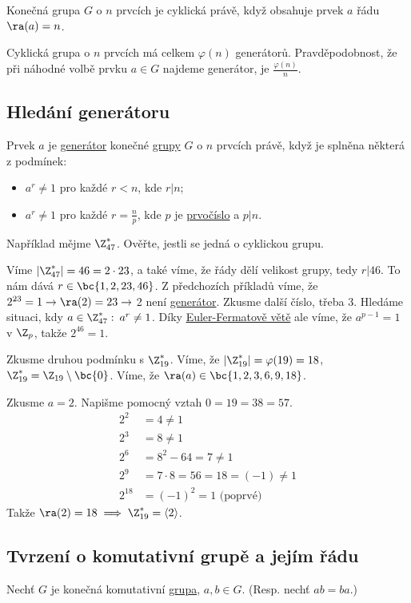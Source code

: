 Konečná grupa $G$ o $n$ prvcích je cyklická právě, když obsahuje prvek $a$ řádu $\ra(a) = n$.

Cyklická grupa o $n$ prvcích má celkem $\varphi(n)$ generátorů. Pravděpodobnost, že při náhodné volbě prvku $a \in G$ najdeme generátor, je $\frac{\varphi(n)}{n}$.

\subsection{Hledání generátoru}
Prvek $a$ je \hyperref[generator]{generátor} konečné \hyperref[grupa]{grupy} $G$ o $n$ prvcích právě, když je splněna některá z podmínek:
\vspace{-1em}
\begin{itemize}
	\item $a^r \not=1$ pro každé $r < n$, kde $r | n$;
	\item $a^r \not=1$ pro každé $r = \frac{n}{p}$, kde $p$ je \hyperref[prvocisla]{prvočíslo} a $p | n$.
\end{itemize}
Například mějme $\Z_{47}^*$. Ověřte, jestli se jedná o cyklickou grupu.

Víme $|\Z_{47}^*| = 46 = 2 \cdot 23$, a také víme, že řády dělí velikost grupy, tedy $r|46$. To nám dává $r \in \bc{1, 2, 23, 46}$. Z předchozích příkladů víme, že $2^{23} = 1 \rightarrow \ra(2) = 23 \rightarrow$ 2 není \hyperref[generator]{generátor}.
Zkusme další číslo, třeba $3$. Hledáme situaci, kdy $a \in \Z_{47}^*:\: a^r \not= 1$. Díky \hyperref[eulerFermat]{Euler-Fermatově větě} ale víme, že $a^{p-1} = 1$ v $\Z_p$, takže $2^{46} = 1$.

Zkusme druhou podmínku s $\Z_{19}^*$.
Víme, že $|\Z_{19}^*| = \varphi(19) = 18$, $\Z_{19}^* = \Z_{19} \setminus \bc{0}$. Víme, že $\ra(a) \in \bc{1, 2, 3, 6, 9, 18}$.

Zkusme $a=2$. Napišme pomocný vztah $0 = 19 = 38 = 57$.
\begin{align}
	2^2 &= 4 \not=1 \\
	2^3 &= 8\not= 1\\
	2^6 &= 8^2 - 64 = 7 \not= 1\\
	2^9 &= 7 \cdot 8 = 56 = 18 = (-1) \not= 1\\
	2^{18} &= (-1)^2 = 1 \text{ (poprvé)}
\end{align}
Takže $\ra(2) = 18 \implies \Z_{19}^* = \langle 2 \rangle$.

\subsection{Tvrzení o komutativní grupě a jejím řádu}
Nechť $G$ je konečná komutativní \hyperref[grupa]{grupa}, $a, b \in G$. (Resp. nechť $ab = ba$.)

